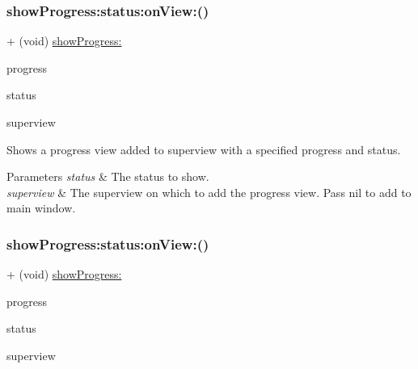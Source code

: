 \subsubsection{\texorpdfstring{show\+Progress\+:status\+:on\+View\+:()}{showProgress:status:onView:()}\hspace{0.1cm}{\footnotesize\ttfamily [2/3]}}
{\footnotesize\ttfamily + (void) \mbox{\hyperlink{interface_k_v_n_progress_abc53102e1cb121a8b38c3337ce372517}{show\+Progress\+:}} \begin{DoxyParamCaption}\item[{(C\+G\+Float)}]{progress }\item[{status:(N\+S\+String $\ast$)}]{status }\item[{onView:(U\+I\+View $\ast$)}]{superview }\end{DoxyParamCaption}}

Shows a progress view added to {\ttfamily superview} with a specified {\ttfamily progress} and {\ttfamily status}. 
\begin{DoxyParams}{Parameters}
{\em status} & The status to show. \\
\hline
{\em superview} & The superview on which to add the progress view. Pass {\ttfamily nil} to add to main window. \\
\hline
\end{DoxyParams}
\mbox{\label{interface_k_v_n_progress_a57a53b4b0ddb93f604d24c50ec9c0602}} 
\subsubsection{\texorpdfstring{show\+Progress\+:status\+:on\+View\+:()}{showProgress:status:onView:()}\hspace{0.1cm}{\footnotesize\ttfamily [3/3]}}
{\footnotesize\ttfamily + (void) \mbox{\hyperlink{interface_k_v_n_progress_abc53102e1cb121a8b38c3337ce372517}{show\+Progress\+:}} \begin{DoxyParamCaption}\item[{(C\+G\+Float)}]{progress }\item[{status:(N\+S\+String $\ast$)}]{status }\item[{onView:(U\+I\+View $\ast$)}]{superview }\end{DoxyParamCaption}}


